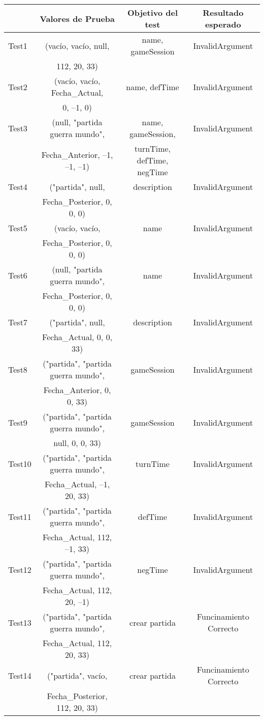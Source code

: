 {\footnotesize
\begin{longtable}[c]{lccc}
 & \textbf{Valores de Prueba} & \textbf{Objetivo del test} & \textbf{Resultado esperado} \\
\hline \hline
\endhead

Test1 & (vacío, vacío, null,  & name, gameSession & InvalidArgument\\
 & 112, 20, 33) & & \\
Test2 & (vacío, vacío, Fecha\_Actual, & name, defTime & InvalidArgument\\
 & 0, --1, 0) & & \\
Test3 & (null, "partida guerra mundo", & name, gameSession, & InvalidArgument\\
 &   Fecha\_Anterior, --1, --1, --1) & turnTime, defTime, negTime & \\
Test4 & ("partida", null,  & description   & InvalidArgument\\
 &  Fecha\_Posterior, 0, 0, 0) & & \\

Test5 & (vacío, vacío,  & name & InvalidArgument\\
 &  Fecha\_Posterior, 0, 0, 0) & & \\
Test6 & (null, "partida guerra mundo",  & name & InvalidArgument\\
 &   Fecha\_Posterior, 0, 0, 0) & & \\
Test7 & ("partida", null,  & description  & InvalidArgument\\
 &  Fecha\_Actual, 0, 0, 33) & & \\
Test8 & ("partida", "partida guerra mundo",  & gameSession & InvalidArgument\\
 &   Fecha\_Anterior, 0, 0, 33) & & \\
Test9 & ("partida", "partida guerra mundo",  & gameSession & InvalidArgument\\
 &   null, 0, 0, 33) & & \\
Test10 & ("partida", "partida guerra mundo",  & turnTime & InvalidArgument\\
 &   Fecha\_Actual, --1, 20, 33) & & \\
Test11 & ("partida", "partida guerra mundo",  & defTime & InvalidArgument\\
 &  Fecha\_Actual, 112, --1, 33) & & \\
Test12 & ("partida", "partida guerra mundo",  & negTime & InvalidArgument\\
 &  Fecha\_Actual, 112, 20, --1) & & \\
Test13 & ("partida", "partida guerra mundo",   & crear partida & Funcinamiento Correcto \\
 &  Fecha\_Actual, 112, 20, 33) & & \\
Test14 & ("partida", vacío,   & crear partida & Funcinamiento Correcto \\
 &  Fecha\_Posterior, 112, 20, 33) & & \\

\hline
\end{longtable}
}

